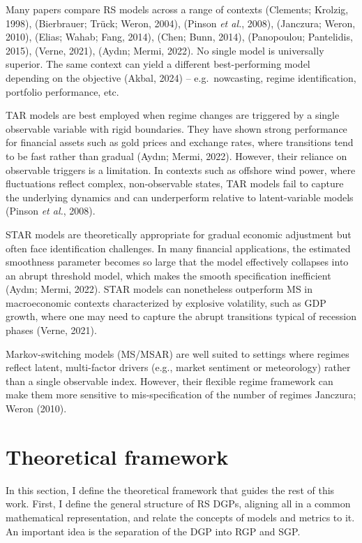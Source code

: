 \documentclass[
  letterpaper,
  DIV=11,
  numbers=noendperiod]{scrartcl}
\numberwithin{equation}{section}
\numberwithin{table}{section}
\numberwithin{figure}{section}
\let\oldsection\section
\renewcommand\section{\clearpage\oldsection}
\begin{document}
Many papers compare RS models across a range of contexts (Clements;
Krolzig, 1998), (Bierbrauer; Trück; Weron, 2004), (Pinson \emph{et al.},
2008), (Janczura; Weron, 2010), (Elias; Wahab; Fang, 2014), (Chen; Bunn,
2014), (Panopoulou; Pantelidis, 2015), (Verne, 2021), (Aydın; Mermi,
2022). No single model is universally superior. The same context can
yield a different best-performing model depending on the objective
(Akbal, 2024) -- e.g.~nowcasting, regime identification, portfolio
performance, etc.

TAR models are best employed when regime changes are triggered by a
single observable variable with rigid boundaries. They have shown strong
performance for financial assets such as gold prices and exchange rates,
where transitions tend to be fast rather than gradual (Aydın; Mermi,
2022). However, their reliance on observable triggers is a limitation.
In contexts such as offshore wind power, where fluctuations reflect
complex, non-observable states, TAR models fail to capture the
underlying dynamics and can underperform relative to latent-variable
models (Pinson \emph{et al.}, 2008).

STAR models are theoretically appropriate for gradual economic
adjustment but often face identification challenges. In many financial
applications, the estimated smoothness parameter becomes so large that
the model effectively collapses into an abrupt threshold model, which
makes the smooth specification inefficient (Aydın; Mermi, 2022). STAR
models can nonetheless outperform MS in macroeconomic contexts
characterized by explosive volatility, such as GDP growth, where one may
need to capture the abrupt transitions typical of recession phases
(Verne, 2021).

Markov-switching models (MS/MSAR) are well suited to settings where
regimes reflect latent, multi-factor drivers (e.g., market sentiment or
meteorology) rather than a single observable index. However, their
flexible regime framework can make them more sensitive to
mis-specification of the number of regimes Janczura; Weron (2010).

\section{Theoretical framework}\label{sec-theory}

In this section, I define the theoretical framework that guides the rest
of this work. First, I define the general structure of RS DGPs, aligning
all in a common mathematical representation, and relate the concepts of
models and metrics to it. An important idea is the separation of the DGP
into RGP and SGP.
\end{document}
